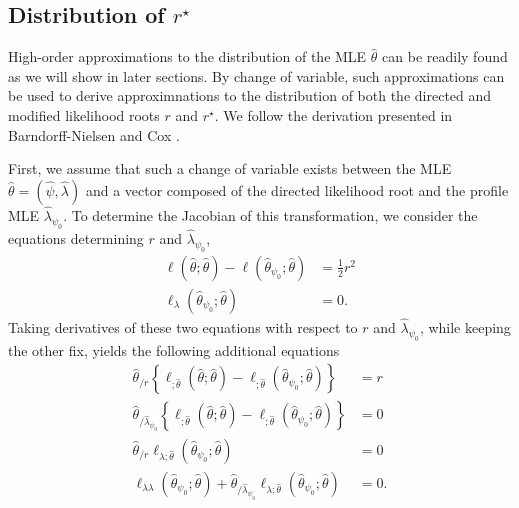 \subsection{Distribution of $r^\star$}

High-order approximations to the distribution of the MLE $\hat\theta$ can be readily found as we will show in later sections. By change of variable, such approximations can be used to derive approximnations to the distribution of both the directed and modified likelihood roots $r$ and $r^\star$. We follow the derivation presented in Barndorff-Nielsen and Cox \cite{BarndorffNielsen1994}.

First, we assume that such a change of variable exists between the MLE $\hat\theta = (\hat\psi, \hat\lambda)$ and a vector composed of the directed likelihood root and the profile MLE $\hat\lambda_{\psi_0}$. To determine the Jacobian of this transformation, we consider the equations determining $r$ and $\hat\lambda_{\psi_0}$,
\begin{align*}
    \ell(\hat\theta; \hat\theta) - \ell(\hat\theta_{\psi_0}; \hat\theta) &= \frac12r^2\\
    \ell_\lambda(\hat\theta_{\psi_0}; \hat\theta) &= 0.
\end{align*}
Taking derivatives of these two equations with respect to $r$ and $\hat\lambda_{\psi_0}$, while keeping the other fix, yields the following additional equations
\begin{align}
    \hat\theta_{/r} \left\{ \ell_{;\hat\theta}(\hat\theta; \hat\theta) - \ell_{;\hat\theta}(\hat\theta_{\psi_0}; \hat\theta) \right\} &= r \label{A}\\
    \hat\theta_{/\hat\lambda_{\psi_0}} \left\{ \ell_{;\hat\theta}(\hat\theta; \hat\theta) - \ell_{;\hat\theta}(\hat\theta_{\psi_0}; \hat\theta) \right\} &= 0\\
    \hat\theta_{/r}\ell_{\lambda; \hat\theta}(\hat\theta_{\psi_0}; \hat\theta) &= 0\\
    \ell_{\lambda\lambda}(\hat\theta_{\psi_0}; \hat\theta) + \hat\theta_{/\hat\lambda_{\psi_0}}\ell_{\lambda; \hat\theta}(\hat\theta_{\psi_0}; \hat\theta) &= 0. \label{eq-score-4}
\end{align}

